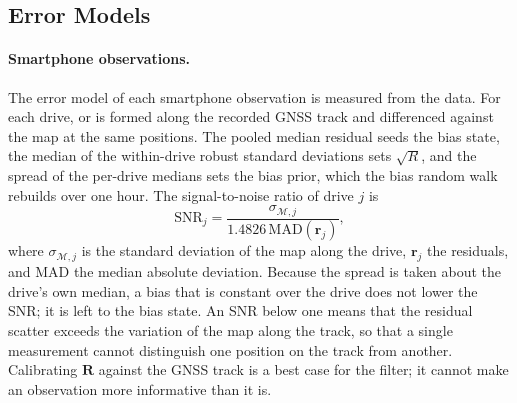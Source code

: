 \subsection{Error Models}
\label{sec:error-models}

\paragraph{Smartphone observations.} The error model of each smartphone observation is measured from the data. For each drive,  or  is formed along the recorded GNSS track and differenced against the map at the same positions. The pooled median residual seeds the bias state, the median of the within-drive robust standard deviations sets \(\sqrt{R}\), and the spread of the per-drive medians sets the bias prior, which the bias random walk rebuilds over one hour. The signal-to-noise ratio of drive \(j\) is
\begin{equation}
  \mathrm{SNR}_j = \frac{\sigma_{\mathcal{M},j}}{1.4826\,\mathrm{MAD}(\mathbf{r}_j)},
  \label{eqn:snr}
\end{equation}
where \(\sigma_{\mathcal{M},j}\) is the standard deviation of the map along the drive, \(\mathbf{r}_j\) the residuals, and MAD the median absolute deviation. Because the spread is taken about the drive's own median, a bias that is constant over the drive does not lower the SNR; it is left to the bias state. An SNR below one means that the residual scatter exceeds the variation of the map along the track, so that a single measurement cannot distinguish one position on the track from another. Calibrating \(\mathbf{R}\) against the GNSS track is a best case for the filter; it cannot make an observation more informative than it is.

\begin{table}[htb]
  \caption{Anomaly Error Models. Smartphone values are measured from the residuals against the maps; dedicated-sensor values are taken from the datasheet models of . Signal \(\sigma\) is the median over drives of \(\sigma_{\mathcal{M},j}\); SNR is the median over drives of , with the best drive in parentheses.}
  \label{tab:error-model}
  \centering
  \small
  
\end{table}

